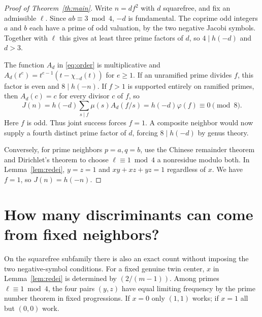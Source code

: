 \documentclass[11pt]{article}
\begin{document}
\begin{proof}[Proof of Theorem~\ref{th:main}]
Write $n=df^2$ with $d$ squarefree, and fix an admissible $\ell$.
Since $ab\equiv3\bmod4$, $-d$ is fundamental. The coprime odd integers
$a$ and $b$ each have a prime of odd valuation, by the two negative
Jacobi symbols. Together with $\ell$ this gives at least three prime
factors of $d$, so $4\mid h(-d)$ and $d>3$.

The function $A_d$ in \eqref{eq:order} is multiplicative and
$A_d(t^e)=t^{e-1}(t-\chi_{-d}(t))$ for $e\ge1$. If an unramified
prime divides $f$, this factor is even and $8\mid h(-n)$.
If $f>1$ is supported entirely on ramified primes, then $A_d(c)=c$
for every divisor $c$ of $f$, so
\[
 J(n)=h(-d)\sum_{s\mid f}\mu(s)A_d(f/s)
     =h(-d)\varphi(f)\equiv0\pmod8.
\]
Here $f$ is odd. Thus joint success forces $f=1$. A composite neighbor
would now supply a fourth distinct prime factor of $d$, forcing
$8\mid h(-d)$ by genus theory.

Conversely, for prime neighbors $p=a,q=b$, use the Chinese remainder
theorem and Dirichlet's theorem to choose $\ell\equiv1\bmod4$ a
nonresidue modulo both. In Lemma~\ref{lem:redei}, $y=z=1$ and
$xy+xz+yz=1$ regardless of $x$. We have $f=1$, so $J(n)=h(-n)$.
\end{proof}

\section{How many discriminants can come from fixed neighbors?}
On the squarefree subfamily there is also an exact count without
imposing the two negative-symbol conditions. For a fixed genuine twin
center, $x$ in Lemma~\ref{lem:redei} is determined by $(2/(m-1))$.
Among primes $\ell\equiv1\bmod4$, the four pairs $(y,z)$ have equal
limiting frequency by the prime number theorem in fixed progressions.
If $x=0$ only $(1,1)$ works; if $x=1$ all but $(0,0)$ work.
\end{document}
